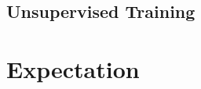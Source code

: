 \documentclass[twoside,twocolumn]{article}
\begin{document}
\subsection{Unsupervised Training}

\section{Expectation}




\end{document}
